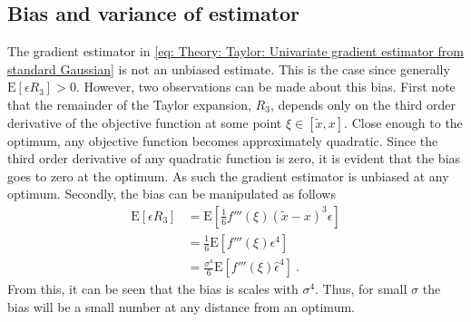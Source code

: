 \subsection{Bias and variance of estimator}\label{sec: Theory: Taylor: Bias and variance of estimator}
The gradient estimator in \eqref{eq: Theory: Taylor: Univariate gradient estimator from standard Gaussian} is not an unbiased estimate. This is the case since generally $\text{E}[\epsilon R_3]>0$. However, two observations can be made about this bias. First note that the remainder of the Taylor expansion, $R_3$, depends only on the third order derivative of the objective function at some point $\xi\in[\tilde{x}, x]$. Close enough to the optimum, any objective function becomes approximately quadratic. Since the third order derivative of any quadratic function is zero, it is evident that the bias goes to zero at the optimum. As such the gradient estimator is unbiased at any optimum. Secondly, the bias can be manipulated as follows
\begin{align}
    \text{E}[\epsilon R_3]
    &= \text{E}\left[\frac{1}{6}f'''(\xi)(\tilde{x}-x)^3\epsilon\right]\nonumber\\
    &= \frac{1}{6}\text{E}\left[f'''(\xi)\epsilon^4\right]\nonumber\\
    &= \frac{\sigma^4}{6}\text{E}\left[f'''(\xi)\hat{\epsilon}^4\right] \ . \label{eq: Theory: Taylor: Bias of univariate gradient}%
\end{align}
From this, it can be seen that the bias is scales with $\sigma^4$. Thus, for small $\sigma$ the bias will be a small number at any distance from an optimum.

